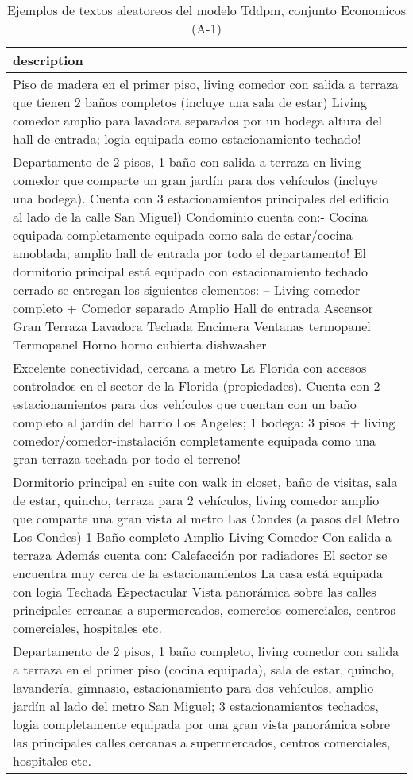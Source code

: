 \begin{table}[H]
\centering
\fontsize{8}{14}\selectfont
\caption{Ejemplos de textos aleatoreos del modelo Tddpm, conjunto Economicos (A-1)}
\label{table-sample10-economicos-a-1-tddpm_mlp-text}
\begin{tabular}{|m{50em}|}
\hline
\rowcolor[gray]{0.8}
description \\
\hline Piso de madera en el primer piso, living comedor con salida a terraza que tienen 2 baños completos (incluye una sala de estar) Living comedor amplio para lavadora separados por un bodega altura del hall de entrada; logia equipada como estacionamiento techado! \\
\hline Departamento de 2 pisos, 1 baño con salida a terraza en living comedor que comparte un gran jardín para dos vehículos (incluye una bodega). Cuenta con 3 estacionamientos principales del edificio al lado de la calle San Miguel) Condominio cuenta con:- Cocina equipada completamente equipada como sala de estar/cocina amoblada; amplio hall de entrada por todo el departamento! El dormitorio principal está equipado con estacionamiento techado cerrado se entregan los siguientes elementos: – Living comedor completo + Comedor separado Amplio Hall de entrada Ascensor Gran Terraza Lavadora Techada Encimera Ventanas termopanel Termopanel Horno horno cubierta dishwasher \\
\hline Excelente conectividad, cercana a metro La Florida con accesos controlados en el sector de la Florida (propiedades). Cuenta con 2 estacionamientos para dos vehículos que cuentan con un baño completo al jardín del barrio Los Angeles; 1 bodega: 3 pisos + living comedor/comedor-instalación completamente equipada como una gran terraza techada por todo el terreno! \\
\hline Dormitorio principal en suite con walk in closet, baño de visitas, sala de estar, quincho, terraza para 2 vehículos, living comedor amplio que comparte una gran vista al metro Las Condes (a pasos del Metro Los Condes) 1 Baño completo Amplio Living Comedor Con salida a terraza Además cuenta con: Calefacción por radiadores El sector se encuentra muy cerca de la estacionamientos La casa está equipada con logia Techada Espectacular Vista panorámica sobre las calles principales cercanas a supermercados, comercios comerciales, centros comerciales, hospitales etc. \\
\hline Departamento de 2 pisos, 1 baño completo, living comedor con salida a terraza en el primer piso (cocina equipada), sala de estar, quincho, lavandería, gimnasio, estacionamiento para dos vehículos, amplio jardín al lado del metro San Miguel; 3 estacionamientos techados, logia completamente equipada por una gran vista panorámica sobre las principales calles cercanas a supermercados, centros comerciales, hospitales etc. \\

\end{tabular}
\end{table}
